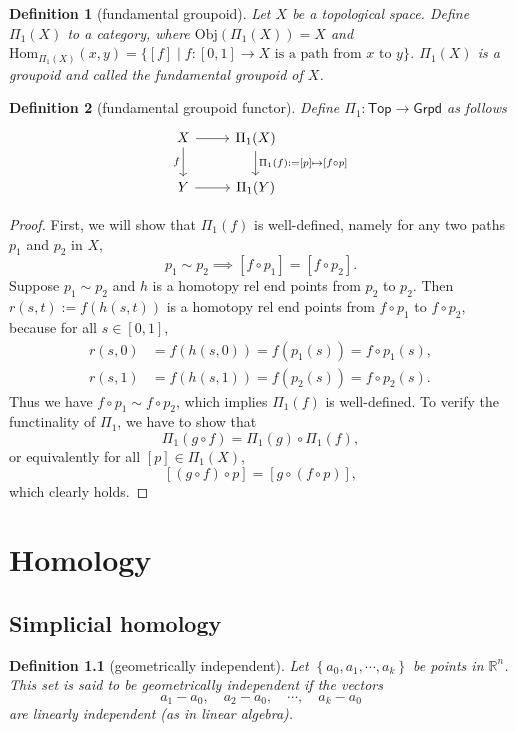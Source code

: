 \documentclass{report}
\newtheorem{definition}{Definition}[section]
\theoremstyle{nonumberplain}
\newtheorem{proof}{Proof.}
\newcommand{\Top}{\mathsf{Top}}
\newcommand{\Grpd}{\mathsf{Grpd}}
\newcommand{\Obj}{\mathrm{Obj}}
\newcommand{\Hom}{\mathrm{Hom}}
\begin{document}
\begin{definition}[fundamental groupoid]
	Let $X$ be a topological space. Define $\Pi_1(X)$ to a category, where $\Obj(\Pi_1(X))=X$ and $\Hom_{\Pi_1(X)}(x,y)=\{[f]\mid f:[0,1]\to X \text{ is a path from $x$ to $y$}\}$. $\Pi_1(X)$ is a groupoid and called the fundamental groupoid of $X$.
\end{definition}
\begin{definition}[fundamental groupoid functor]
	Define $\Pi_1:\Top\to\Grpd$ as follows
	\[\begin{tikzcd}
		X & {\Pi_1(X)}\\
		Y & {\Pi_1(Y)} 
		\arrow["f"', from=1-1, to=2-1]
		\arrow["{\Pi_1(f):=[p]\mapsto[f\circ p]}", from=1-2, to=2-2]
		\arrow[from=1-1, to=1-2]
		\arrow[from=2-1, to=2-2]
	\end{tikzcd}\]
\end{definition}
\begin{proof}
	First, we will show that $\Pi_1(f)$ is well-defined, namely for any two paths $p_1$ and $p_2$ in $X$,
	\[
		p_1\sim p_2 \implies [f\circ p_1] = [f\circ p_2].
	\]
	Suppose $p_1\sim p_2$ and $h$ is a homotopy rel end points from $p_2$ to $p_2$. Then $r(s,t):=f(h(s, t))$
	is a homotopy rel end points from $f\circ p_1$ to $f\circ p_2$, because for all $s\in[0,1]$,
	\begin{align*}
		r(s,0)&=f(h(s,0))=f(p_1(s))=f\circ p_1(s),\\
		r(s,1)&=f(h(s,1))=f(p_2(s))=f\circ p_2(s).
	\end{align*}
	Thus we have $f\circ p_1\sim f\circ p_2$, which implies $\Pi_1(f)$ is well-defined.
	To verify the functinality of $\Pi_1$, we have to show that
	\[
		\Pi_1(g\circ f) = \Pi_1(g)\circ\Pi_1(f),
	\]
	or equivalently for all $[p]\in \Pi_1(X)$,
	\[
		[(g\circ f)\circ p]=[g\circ (f\circ p)],
	\]
	which clearly holds. 
\end{proof}

\chapter{Homology}
\section{Simplicial homology}

\begin{definition}[geometrically independent]
	Let $\left\{a_0, a_1, \cdots, a_k\right\}$ be points in $\mathbb{R}^n$. This set is said to be \emph{geometrically independent} if the vectors
$$
a_1-a_0, \quad a_2-a_0, \quad \cdots, \quad a_k-a_0
$$
are linearly independent (as in linear algebra).
\end{definition}
\end{document}
